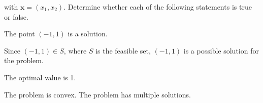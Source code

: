 \documentclass[12pt,a4paper]{article}
\begin{document}
with \(\mathbf{x} = (x_1, x_2)\). Determine whether each of the following statements is true or false.

\subproblem The point \((-1, 1)\) is a solution.

Since \((-1, 1) \in S\), where \(S\) is the feasible set, \((-1, 1)\) is a possible solution for the problem.

\subproblem The optimal value is 1.



\subproblem The problem is convex.
\subproblem The problem has multiple solutions.
\end{document}
